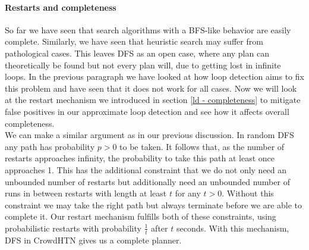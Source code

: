 \paragraph{Restarts and completeness}
So far we have seen that search algorithms with a BFS-like behavior are easily complete. Similarly, we have seen that heuristic search may suffer from pathological cases. This leaves DFS as an open case, where any plan can theoretically be found but not every plan will, due to getting lost in infinite loops. In the previous paragraph we have looked at how loop detection aims to fix this problem and have seen that it does not work for all cases. Now we will look at the restart mechanism we introduced in section \ref{ld - completeness} to mitigate false positives in our approximate loop detection and see how it affects overall completeness. \\
We can make a similar argument as in our previous discussion. In random DFS any path has probability $p > 0$ to be taken. It follows that, as the number of restarts approaches infinity, the probability to take this path at least once approaches 1. This has the additional constraint that we do not only need an unbounded number of restarts but additionally need an unbounded number of runs in between restarts with length at least $t$ for any $t > 0$. Without this constraint we may take the right path but always terminate before we are able to complete it. Our restart mechanism fulfills both of these constraints, using probabilistic restarts with probability $\frac{1}{t}$ after $t$ seconds. With this mechanism, DFS in CrowdHTN gives us a complete planner.

